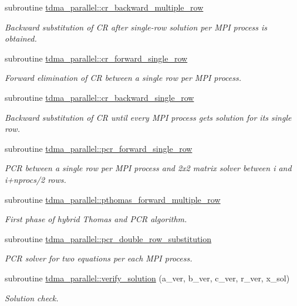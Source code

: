 \begin{DoxyCompactItemize}
subroutine \mbox{\hyperlink{namespacetdma__parallel_af9df427633cb9dc93aae24114abf95d7}{tdma\+\_\+parallel\+::cr\+\_\+backward\+\_\+multiple\+\_\+row}}
\begin{DoxyCompactList}\small\item\em Backward substitution of CR after single-\/row solution per M\+PI process is obtained. \end{DoxyCompactList}\item 
subroutine \mbox{\hyperlink{namespacetdma__parallel_a33fc3b14caafcdd849e1d4c08e766695}{tdma\+\_\+parallel\+::cr\+\_\+forward\+\_\+single\+\_\+row}}
\begin{DoxyCompactList}\small\item\em Forward elimination of CR between a single row per M\+PI process. \end{DoxyCompactList}\item 
subroutine \mbox{\hyperlink{namespacetdma__parallel_a463b29782692ccfe72b867d5a4b7f2f2}{tdma\+\_\+parallel\+::cr\+\_\+backward\+\_\+single\+\_\+row}}
\begin{DoxyCompactList}\small\item\em Backward substitution of CR until every M\+PI process gets solution for its single row. \end{DoxyCompactList}\item 
subroutine \mbox{\hyperlink{namespacetdma__parallel_aaf75cee6f05e371d59e0d40cb5138192}{tdma\+\_\+parallel\+::pcr\+\_\+forward\+\_\+single\+\_\+row}}
\begin{DoxyCompactList}\small\item\em P\+CR between a single row per M\+PI process and 2x2 matrix solver between i and i+nprocs/2 rows. \end{DoxyCompactList}\item 
subroutine \mbox{\hyperlink{namespacetdma__parallel_a15527e0932190d7abd8b716641de36e8}{tdma\+\_\+parallel\+::pthomas\+\_\+forward\+\_\+multiple\+\_\+row}}
\begin{DoxyCompactList}\small\item\em First phase of hybrid Thomas and P\+CR algorithm. \end{DoxyCompactList}\item 
subroutine \mbox{\hyperlink{namespacetdma__parallel_a438b27a63218775dcccdc41dcb7a6a36}{tdma\+\_\+parallel\+::pcr\+\_\+double\+\_\+row\+\_\+substitution}}
\begin{DoxyCompactList}\small\item\em P\+CR solver for two equations per each M\+PI process. \end{DoxyCompactList}\item 
subroutine \mbox{\hyperlink{namespacetdma__parallel_a9c627d634cb17863dd5ab60b3f4f8d11}{tdma\+\_\+parallel\+::verify\+\_\+solution}} (a\+\_\+ver, b\+\_\+ver, c\+\_\+ver, r\+\_\+ver, x\+\_\+sol)
\begin{DoxyCompactList}\small\item\em Solution check. \end{DoxyCompactList}\end{DoxyCompactItemize}
